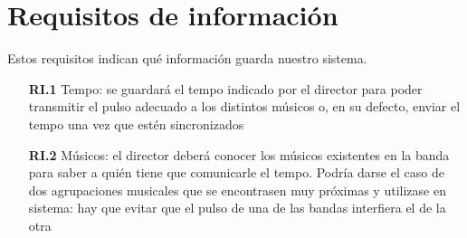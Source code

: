 \section{Requisitos de información}

Estos requisitos indican qué información guarda nuestro sistema.\\

  \begin{itemize}
    \item[\textbf{RI.1}] Tempo: se guardará el tempo indicado por el director
    para poder transmitir el pulso adecuado a los distintos músicos o, en su defecto,
    enviar el tempo una vez que estén sincronizados
    \item[\textbf{RI.2}] Músicos: el director deberá conocer los músicos existentes en la banda
    para saber a quién tiene que comunicarle el tempo. Podría darse el caso de dos
    agrupaciones musicales que se encontrasen muy próximas y utilizase en sistema:
    hay que evitar que el pulso de una de las bandas interfiera el de la otra
  \end{itemize}
